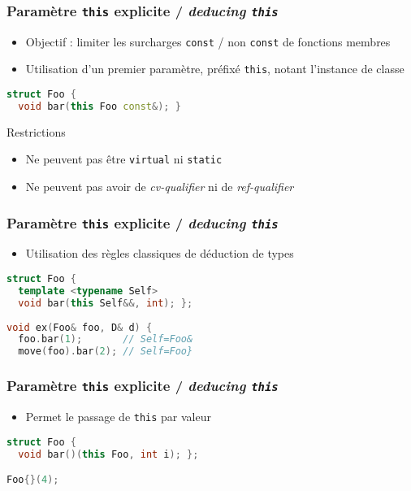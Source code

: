 \documentclass[C++.tex]{subfiles}
\begin{document}
\begin{frame}[fragile]
	\frametitle{Paramètre \lstinline|this| explicite / \textit{deducing \lstinline|this|}}
	\begin{itemize}
		\item Objectif : limiter les surcharges \lstinline|const| / non \lstinline|const| de fonctions membres
		\item Utilisation d'un premier paramètre, préfixé \lstinline|this|, notant l'instance de classe
	\end{itemize}

	\begin{lstlisting}[language=C++]
struct Foo {
  void bar(this Foo const&); }\end{lstlisting}

	\begin{alertblock}{Restrictions}
		\begin{itemize}
			\item Ne peuvent pas être \lstinline|virtual| ni \lstinline|static|
			\item Ne peuvent pas avoir de \textit{cv-qualifier} ni de \textit{ref-qualifier}
		\end{itemize}
	\end{alertblock}
\end{frame}

\begin{frame}[fragile]
	\frametitle{Paramètre \lstinline|this| explicite / \textit{deducing \lstinline|this|}}
	\begin{itemize}
		\item Utilisation des règles classiques de déduction de types 
	\end{itemize}

	\begin{lstlisting}[language=C++]
struct Foo {
  template <typename Self>
  void bar(this Self&&, int); };
	
void ex(Foo& foo, D& d) {
  foo.bar(1);       // Self=Foo&
  move(foo).bar(2); // Self=Foo}\end{lstlisting}
\end{frame}

\begin{frame}[fragile]
	\frametitle{Paramètre \lstinline|this| explicite / \textit{deducing \lstinline|this|}}
	\begin{itemize}
		\item Permet le passage de \lstinline|this| par valeur
	\end{itemize}

	\begin{lstlisting}[language=C++]
struct Foo {
  void bar()(this Foo, int i); };

Foo{}(4);\end{lstlisting}
\end{frame}
\end{document}
